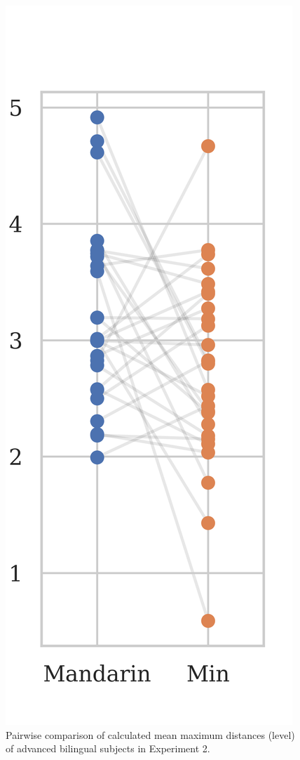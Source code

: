 \documentclass[12pt]{report}
\begin{document}
\begin{CJK}{UTF8}{bsmi}
\begin{figure}[hbt!]
\centering
\includegraphics[scale=1, trim={0 .5cm 0 0}]{Figures/E2/Result_bilingual.png}
\caption{Pairwise comparison of calculated mean maximum distances (level) of advanced bilingual subjects in Experiment 2.}
\label{Figure:DistBilingualBoxPlot}
\end{figure}


\end{CJK}
\end{document}
